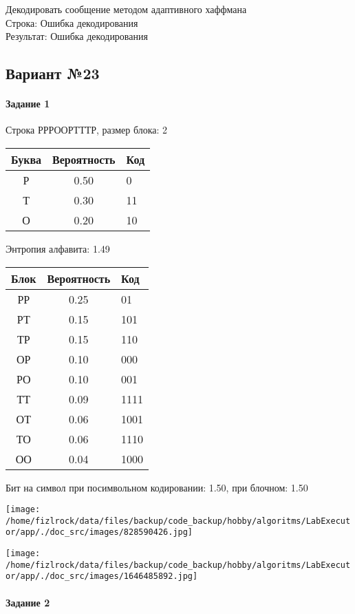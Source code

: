 \documentclass[a4paper, 12pt]{article}
\begin{document}
Декодировать сообщение методом адаптивного хаффмана \\
Строка: 
Ошибка декодирования\\
Результат: Ошибка декодирования
\pagebreak
\subsection{Вариант №23}
\paragraph{Задание 1}

Строка РРРООРТТТР, размер блока: 2
\begin{center}
 \begin{tabular}{ |c|c|l| } 
  \hline
     Буква & Вероятность & Код\\ \hline
Р & 0.50 & 0\\\hline
Т & 0.30 & 11\\\hline
О & 0.20 & 10
\\ \hline \end{tabular}
\end{center}
Энтропия алфавита: 1.49
\begin{center}
 \begin{tabular}{ |c|c|l| } 
  \hline
     Блок & Вероятность & Код\\ \hline
РР & 0.25 & 01\\\hline
РТ & 0.15 & 101\\\hline
ТР & 0.15 & 110\\\hline
ОР & 0.10 & 000\\\hline
РО & 0.10 & 001\\\hline
ТТ & 0.09 & 1111\\\hline
ОТ & 0.06 & 1001\\\hline
ТО & 0.06 & 1110\\\hline
ОО & 0.04 & 1000
\\ \hline \end{tabular}
\end{center}
Бит на символ при посимвольном кодировании: 1.50, при блочном: 1.50

\texttt{[image: /home/fizlrock/data/files/backup/code\_backup/hobby/algoritms/LabExecutor/app/./doc\_src/images/828590426.jpg]}

\texttt{[image: /home/fizlrock/data/files/backup/code\_backup/hobby/algoritms/LabExecutor/app/./doc\_src/images/1646485892.jpg]}
\pagebreak
\paragraph{Задание 2}
\end{document}
